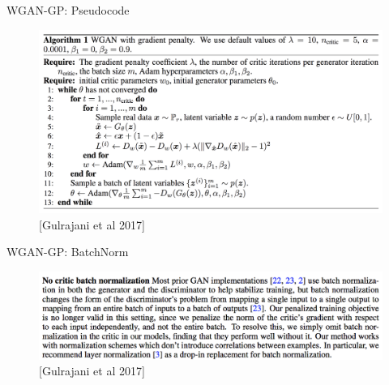 \begin{frame}[allowframebreaks]{WGAN-GP: Pseudocode}
    \begin{figure}
        \centering
        \includegraphics[height=0.8\textheight, width=1.05\textwidth, keepaspectratio]{images/gan/wgan-gp/slide_86_1_img.png}
        \caption*{[Gulrajani et al 2017]}
    \end{figure}
\end{frame}

\begin{frame}[allowframebreaks]{WGAN-GP: BatchNorm}
    \begin{figure}
        \centering
        \includegraphics[height=0.8\textheight, width=1.05\textwidth, keepaspectratio]{images/gan/wgan-gp/slide_87_1_img.png}
        \caption*{[Gulrajani et al 2017]}
    \end{figure}
\end{frame}

